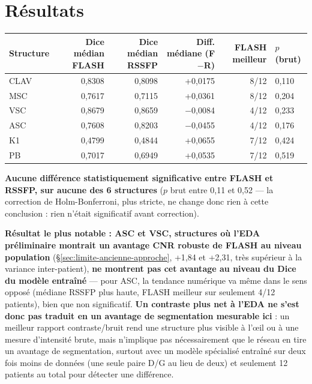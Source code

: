 \documentclass[11pt,a4paper]{report}
\begin{document}
\section{Résultats}

\begin{center}
\begin{tabular}{lrrrrl}
\toprule
Structure & Dice médian FLASH & Dice médian RSSFP & Diff. médiane (F$-$R) & FLASH
meilleur & $p$ (brut) \\
\midrule
CLAV & 0,8308 & 0,8098 & +0,0175 & 8/12 & 0,110 \\
MSC  & 0,7617 & 0,7115 & +0,0361 & 8/12 & 0,204 \\
VSC  & 0,8679 & 0,8659 & $-$0,0084 & 4/12 & 0,233 \\
ASC  & 0,7608 & 0,8203 & $-$0,0455 & 4/12 & 0,176 \\
K1   & 0,4799 & 0,4844 & +0,0655 & 7/12 & 0,424 \\
PB   & 0,7017 & 0,6949 & +0,0535 & 7/12 & 0,519 \\
\bottomrule
\end{tabular}
\end{center}

\textbf{Aucune différence statistiquement significative entre FLASH et RSSFP, sur
aucune des 6 structures} ($p$ brut entre 0,11 et 0,52 --- la correction de
Holm-Bonferroni, plus stricte, ne change donc rien à cette conclusion : rien n'était
significatif avant correction).

\textbf{Résultat le plus notable : ASC et VSC, structures où l'EDA préliminaire
montrait un avantage CNR robuste de FLASH au niveau population}
(\S\ref{sec:limite-ancienne-approche}, +1,84 et +2,31, très supérieur à la variance
inter-patient), \textbf{ne montrent pas cet avantage au niveau du Dice du modèle
entraîné} --- pour ASC, la tendance numérique va même dans le sens opposé (médiane
RSSFP plus haute, FLASH meilleur sur seulement 4/12 patients), bien que non
significatif. \textbf{Un contraste plus net à l'EDA ne s'est donc pas traduit en un
avantage de segmentation mesurable ici} : un meilleur rapport contraste/bruit rend
une structure plus visible à l'œil ou à une mesure d'intensité brute, mais n'implique
pas nécessairement que le réseau en tire un avantage de segmentation, surtout avec
un modèle spécialisé entraîné sur deux fois moins de données (une seule paire D/G au
lieu de deux) et seulement 12 patients au total pour détecter une différence.
\end{document}
